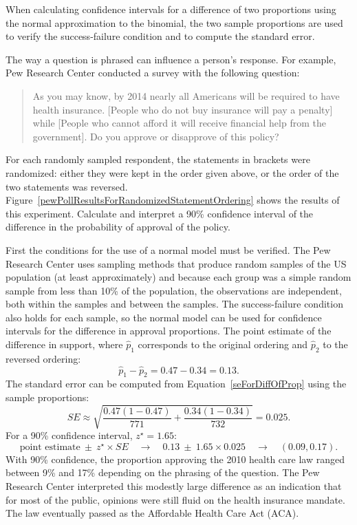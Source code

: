 When calculating confidence intervals for a difference of two proportions using the normal approximation to the binomial, the two sample proportions are used to verify the success-failure condition and to compute the standard error.

\begin{examplewrap}
\begin{nexample}{The way a question is phrased can influence a person's response. For example, Pew Research Center conducted a survey with the following question:\footnotemark{}
\begin{quote}
As you may know, by 2014 nearly all Americans will be required to have health insurance. [People who do not buy insurance will pay a penalty] while [People who cannot afford it will receive financial help from the government]. Do you approve or disapprove of this policy?
\end{quote}
For each randomly sampled respondent, the statements in brackets were randomized: either they were kept in the order given above, or the order of the two statements was reversed. Figure~\ref{pewPollResultsForRandomizedStatementOrdering} shows the results of this experiment. Calculate and interpret a 90\% confidence interval of the difference in the probability of approval of the policy.}
First the conditions for the use of a normal model must be verified. The Pew Research Center uses sampling methods that produce random samples of the US population (at least approximately) and because each group was a simple random sample from less than 10\% of the population, the observations are independent, both within the samples and between the samples. The success-failure condition also holds for each sample, so the normal model can be used for confidence intervals for the difference in approval proportions.  The point estimate of the difference in support, where $\hat{p}_1$ corresponds to the original ordering and $\hat{p}_2$ to the reversed ordering:
$$\hat{p}_{1} - \hat{p}_{2} = 0.47 - 0.34 = 0.13.$$
The standard error can be computed from Equation~\eqref{seForDiffOfProp} using the sample proportions:
$$SE \approx \sqrt{\frac{0.47(1-0.47)}{771} + \frac{0.34(1-0.34)}{732}} = 0.025.$$
For a 90\% confidence interval, $z^{\star} = 1.65$:
$$\text{point estimate} \ \pm\ z^{\star} \times SE \quad \to \quad 0.13 \ \pm\ 1.65 \times  0.025 \quad \to \quad (0.09, 0.17).$$
With 90\% confidence, the proportion approving the 2010 health care law ranged between 9\% and 17\% depending on the phrasing of the question. The Pew Research Center interpreted this modestly large difference as an indication that for most of the public, opinions were still fluid on the health insurance mandate.  The law eventually passed as the Affordable Health Care Act (ACA).
\end{nexample}
\end{examplewrap}

